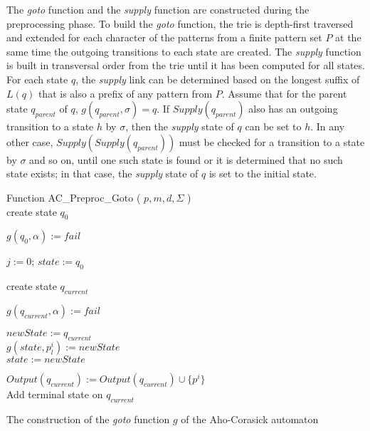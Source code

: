 \documentclass{ws-ijait}
\begin{document}
The \textit{goto} function and the \textit{supply} function are constructed during the preprocessing phase. To build the \textit{goto} function, the trie is depth-first traversed and extended for each character of the patterns from a finite pattern set $P$ at the same time the outgoing transitions to each state are created. The \textit{supply} function is built in transversal order from the trie until it has been computed for all states. For each state $q$, the \textit{supply} link can be determined based on the longest suffix of $L(q)$ that is also a prefix of any pattern from $P$. Assume that for the parent state $q_{parent}$ of $q$, $g(q_{parent}, \sigma) = q$. If $Supply(q_{parent})$ also has an outgoing transition to a state $h$ by $\sigma$, then the \textit{supply} state of $q$ can be set to $h$. In any other case, $Supply(Supply(q_{parent}))$ must be checked for a transition to a state by $\sigma$ and so on, until one such state is found or it is determined that no such state exists; in that case, the \textit{supply} state of $q$ is set to the initial state.

\begin{algorithm}[H]

Function AC\_Preproc\_Goto ( $p, m, d, \Sigma$ )\\

create state $q_0$

\ForAll{ $\alpha \in \Sigma$ } {

	$g(q_0, \alpha) := fail$
}

 {

	$j := 0$; $state := q_0$\\
	
	
	 {
		
		create state $q_{current}$\\
		
		\ForAll{ $\alpha \in \Sigma$ } {

			$g(q_{current}, \alpha) := fail$

		}
		
		$newState := q_{current}$\\
	
		$g(state, p^i_l) := newState$\\
	
		$state := newState$\\
	}
	
	$Output(q_{current}) := Output(q_{current}) \cup \{p^i\}$\\
	Add terminal state on $q_{current}$\\
}

\caption{The construction of the \textit{goto} function $g$ of the Aho-Corasick automaton}
\label{compl:aho_corasick_preprocessing_goto}
\end{algorithm}
\end{document}

